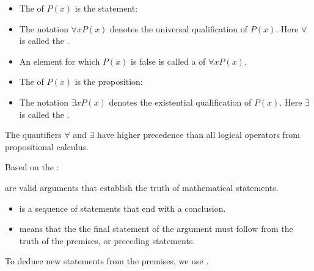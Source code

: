             \begin{itemize}
                \item The  of $P(x)$ is the statement: \\
                \item The notation $\forall x P(x)$ denotes the universal qualification of
                    $P(x)$. Here $\forall$ is called the .
                \item An element for which $P(x)$ is false is called a 
                    of $\forall x P(x)$.
            \end{itemize}
            \begin{itemize}
                \item The  of $P(x)$ is the proposition: \\
                \item The notation $\exists x P(x)$ denotes the existential qualification of
                    $P(x)$. Here $\exists$ is called the .
            \end{itemize}
            \par The quantifiers $\forall$ and $\exists$ have higher precedence than all
                logical operators from propositional calculus.
            \par Based on the :
    \hiiEND

\pagebreak


\pagebreak

        \par {} are valid arguments that establish the truth of mathematical
        statements.
        \begin{itemize}
            \item {} is a sequence of statements that end with a conclusion.
            \item {} means that the the final statement of the argument must follow
                from the truth of the premises, or preceding statements.
        \end{itemize}
        \par To deduce new statements from the premises, we use .

